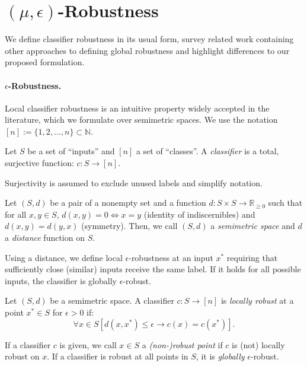 \section{$(\mu,\epsilon)$-Robustness}
\label{sec:new-robustness}

We define classifier robustness in its usual form, survey related work containing other approaches to defining global robustness and highlight differences to our proposed formulation.

\paragraph{$\epsilon$-Robustness.} Local classifier robustness is an intuitive property widely accepted in the literature, which we formulate over semimetric spaces. We use the notation $[n] := \{1, 2, \dots,n\} \subset \mathbb{N}$.
\begin{definition}[Classifier]
\label{def:classifier}
Let $S$ be a set of \enquote{inputs}  and  $[n]$ a set of \enquote{classes}. 
A \emph{classifier} is a total, surjective function:
$c: S \rightarrow [n]$. 
\end{definition}
Surjectivity is assumed to exclude unused labels and simplify notation.
\begin{definition}
\label{def:distance}
    Let $(S, d)$ be a pair of a nonempty set and a function $d: S \times S \rightarrow \mathbb{R}_{\geq 0}$ such that for all $x,y \in S$, $d(x,y) = 0 \iff x = y$ (identity of indiscernibles) and $d(x,y) = d(y,x)$ (symmetry). Then, we call $(S, d)$ a \emph{semimetric space} and $d$ a \emph{distance} function on $S$.
\end{definition}
Using a distance, we define local $\epsilon$-robustness at an input $x^*$ requiring that sufficiently close (similar) inputs receive the same label. If it holds for all possible inputs, the classifier is globally $\epsilon$-robust.
\begin{definition}
\label{def:local-robustness}
Let $(S,d)$ be a semimetric space. A classifier $c: S \rightarrow [n]$ is \emph{locally robust} at a point $x^* \in S$ for $\epsilon > 0$ if:
$$\forall x \in S [d(x, x^*) \leq \epsilon \rightarrow c(x) = c(x^*)].$$    
\end{definition}
If a classifier $c$ is given, we call $x \in S$ a \textit{(non-)robust point} if $c$ is (not) locally robust on $x$. If a classifier is robust at all points in $S$, it is \emph{globally} $\epsilon$-robust.

